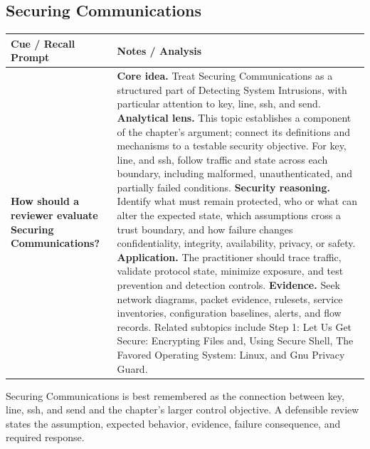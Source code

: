 \documentclass[11pt]{article}
\newcommand{\CornellHeader}{%
\rowcolor{Navy}\color{white}\bfseries Cue / Recall Prompt & \color{white}\bfseries Notes / Analysis\\\hline}
\newcommand{\CornellRow}[2]{%
\cellcolor{CueGray}\RaggedRight\textbf{#1} & \RaggedRight #2\\\hline}
\begin{document}
\subsection*{Securing Communications}
\begin{longtable}{>{\RaggedRight\arraybackslash}p{}|>{\RaggedRight\arraybackslash}p{}}
\CornellHeader
\CornellRow{How should a reviewer evaluate Securing Communications?}{\textbf{Core idea.} Treat Securing Communications as a structured part of Detecting System Intrusions, with particular attention to key, line, ssh, and send. \textbf{Analytical lens.} This topic establishes a component of the chapter's argument; connect its definitions and mechanisms to a testable security objective. For key, line, and ssh, follow traffic and state across each boundary, including malformed, unauthenticated, and partially failed conditions. \textbf{Security reasoning.} Identify what must remain protected, who or what can alter the expected state, which assumptions cross a trust boundary, and how failure changes confidentiality, integrity, availability, privacy, or safety. \textbf{Application.} The practitioner should trace traffic, validate protocol state, minimize exposure, and test prevention and detection controls. \textbf{Evidence.} Seek network diagrams, packet evidence, rulesets, service inventories, configuration baselines, alerts, and flow records. Related subtopics include Step 1: Let Us Get Secure: Encrypting Files and, Using Secure Shell, The Favored Operating System: Linux, and Gnu Privacy Guard.}
\end{longtable}
\begin{topicsummary}
Securing Communications is best remembered as the connection between key, line, ssh, and send and the chapter's larger control objective. A defensible review states the assumption, expected behavior, evidence, failure consequence, and required response.
\end{topicsummary}
\end{document}
